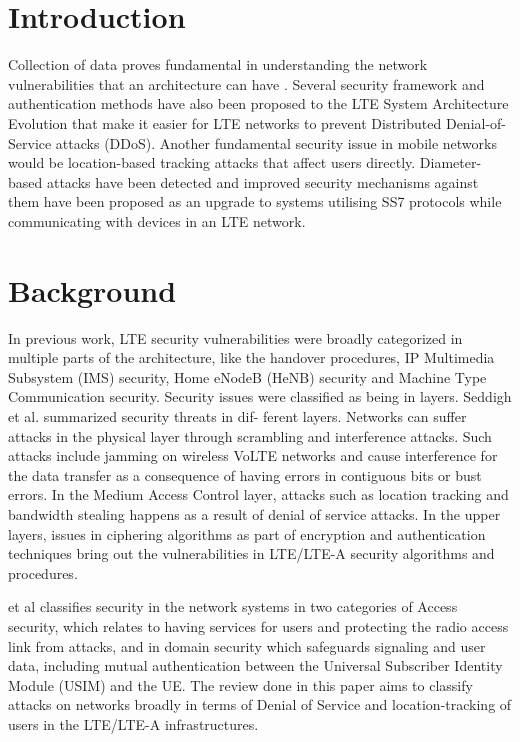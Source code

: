 \documentclass[sigconf,nonacm]{acmart}
\begin{document}
\section{Introduction}

Collection of data proves fundamental in understanding the network vulnerabilities that an architecture can have \cite{ek}. Several security framework and authentication methods have also been proposed to the LTE System Architecture Evolution that make it easier for LTE networks to prevent Distributed Denial-of-Service attacks (DDoS). Another fundamental security issue in mobile networks would be location-based tracking attacks that affect users directly. Diameter-based attacks \cite{teen} have been detected and improved security mechanisms against them have been proposed as an upgrade to systems utilising SS7 protocols while communicating with devices in an LTE network.

\section{Background}
In previous work, LTE security vulnerabilities were broadly categorized in multiple parts of the architecture, like the handover procedures, IP Multimedia Subsystem (IMS) security, Home eNodeB (HeNB) security and Machine Type Communication security. Security issues were classified as being in layers. Seddigh et al. \cite{chaar} summarized security threats in dif- ferent layers. Networks can suffer attacks in the physical layer through scrambling and interference attacks. Such attacks include jamming on wireless VoLTE networks and cause interference for the data transfer as a consequence of having errors in contiguous bits or bust errors. In the Medium Access Control layer, attacks such as location tracking and bandwidth stealing happens as a result of denial of service attacks. In the upper layers, issues in ciphering algorithms as part of encryption and authentication techniques bring out the vulnerabilities in LTE/LTE-A security algorithms and procedures.

\cite{ek} et al classifies security in the network systems in two categories of Access security, which relates to having services for users and protecting the radio access link from attacks, and in domain security which safeguards signaling and user data, including mutual authentication between the Universal Subscriber Identity Module (USIM) and the UE. The review done in this paper aims to classify attacks on networks broadly in terms of Denial of Service and location-tracking of users in the LTE/LTE-A infrastructures. 
\end{document}
